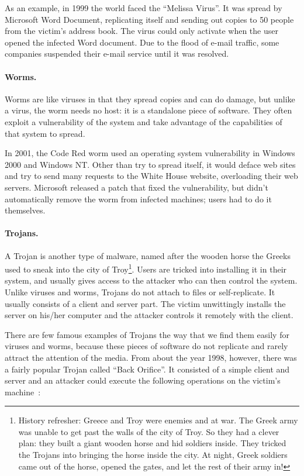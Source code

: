 As an example, in 1999 the world faced the ``Melissa Virus''. It was spread by Microsoft Word Document, replicating itself and sending out copies to 50 people from the victim's address book. The virus could only activate when the user opened the infected Word document. Due to the flood of e-mail traffic, some companies suspended their e-mail service until it was resolved.

\paragraph{Worms.}
Worms are like viruses in that they spread copies and can do damage, but unlike a virus, the worm needs no host: it is a standalone piece of software. They often exploit a vulnerability of the system and take advantage of the capabilities of that system to spread.

In 2001, the Code Red worm used an operating system vulnerability in Windows 2000 and Windows NT. Other than try to spread itself, it would deface web sites and try to send many requests to the White House website, overloading their web servers. Microsoft released a patch that fixed the vulnerability, but didn't automatically remove the worm from infected machines; users had to do it themselves.


\paragraph{Trojans.}
A Trojan is another type of malware, named after the wooden horse the Greeks used to sneak into the city of Troy\footnote{History refresher: Greece and Troy were enemies and at war. The Greek army was unable to get past the walls of the city of Troy. So they had a clever plan: they built a giant wooden horse and hid soldiers inside. They tricked the Trojans into bringing the horse inside the city. At night, Greek soldiers came out of the horse, opened the gates, and let the rest of their army in!}. Users are tricked into installing it in their system, and usually gives access to the attacker who can then control the system. Unlike viruses and worms, Trojans do not attach to files or self-replicate. It usually consists of a client and server part. The victim unwittingly installs the server on his/her computer and the attacker controls it remotely with the client.

There are few famous examples of Trojans the way that we find them easily for viruses and worms, because these pieces of software do not replicate and rarely attract the attention of the media. From about the year 1998, however, there was a fairly popular Trojan called ``Back Orifice''. It consisted of a simple client and server and an attacker could execute the following operations on the victim's machine~\cite{backor}:

